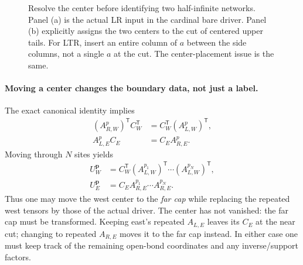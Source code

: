 \documentclass[11pt]{article}
\begin{document}
\begin{figure}[htbp]\centering
{}
\caption{Resolve the center before identifying two half-infinite networks.
Panel (a) is the actual LR input in the cardinal bare driver. Panel (b)
explicitly assigns the two centers to the cut of centered upper tails.
For LTR, insert an entire column of $a$ between the side columns, not a
single $a$ at the cut. The center-placement issue is the same.}
\label{fig:centers-at-cut}
\end{figure}

\paragraph{Moving a center changes the boundary data, not just a label.}
The exact canonical identity implies
\begin{align}
 (A_{R,W}^p)^{\mathsf T}C_W^{\mathsf T}
   &=C_W^{\mathsf T}(A_{L,W}^p)^{\mathsf T},\\
 A_{L,E}^p C_E&=C_E A_{R,E}^p.
\end{align}
Moving through $N$ sites yields
\begin{align}
 U_W^{\mathbf p}
 &=C_W^{\mathsf T}(A_{L,W}^{p_1})^{\mathsf T}\cdots
                            (A_{L,W}^{p_N})^{\mathsf T},\\
 U_E^{\mathbf p}&=C_E A_{R,E}^{p_1}\cdots A_{R,E}^{p_N}.
\end{align}
Thus one may move the west center to the \emph{far cap} while replacing
the repeated west tensors by those of the actual driver. The center has
not vanished: the far cap must be transformed. Keeping east's repeated
$A_{L,E}$ leaves its $C_E$ at the near cut; changing to repeated $A_{R,E}$
moves it to the far cap instead. In either case one must keep track of the
remaining open-bond coordinates and any inverse/support factors.
\end{document}
